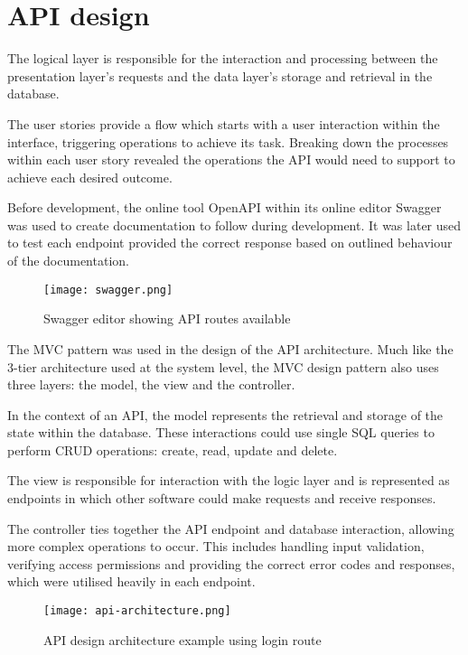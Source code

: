 \section{API design}
The logical layer is responsible for the interaction and processing between the presentation layer's requests and the data layer's storage and retrieval in the database.

The user stories provide a flow which starts with a user interaction within the interface, triggering operations to achieve its task. Breaking down the processes within each user story revealed the operations the API would need to support to achieve each desired outcome.

Before development, the online tool OpenAPI within its online editor Swagger was used to create documentation to follow during development. It was later used to test each endpoint provided the correct response based on outlined behaviour of the documentation.

\begin{figure}[ht!]
    \centerline{\texttt{[image: swagger.png]}}
    \caption{Swagger editor showing API routes available}
    \label{fig:swagger}
\end{figure}

The MVC pattern was used in the design of the API architecture. Much like the 3-tier architecture used at the system level, the MVC design pattern also uses three layers: the model, the view and the controller.

In the context of an API, the model represents the retrieval and storage of the state within the database. These interactions could use single SQL queries to perform CRUD operations: create, read, update and delete.

The view is responsible for interaction with the logic layer and is represented as endpoints in which other software could make requests and receive responses.

The controller ties together the API endpoint and database interaction, allowing more complex operations to occur. This includes handling input validation, verifying access permissions and providing the correct error codes and responses, which were utilised heavily in each endpoint.

\begin{figure}[ht!]
    \centerline{\texttt{[image: api-architecture.png]}}
    \caption{API design architecture example using login route}
    \label{fig:apiarc}
\end{figure}

